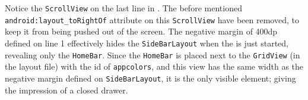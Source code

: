 Notice the \lstinline|ScrollView| on the last line in .
The before mentioned \lstinline{android:layout_toRightOf} attribute on this \lstinline|ScrollView| have been removed, to keep it from being pushed out of the screen.
The negative margin of 400dp defined on line 1 effectively hides the \lstinline|SideBarLayout| when the \homeactivity is just started, revealing only the \lstinline|HomeBar|.
Since the \lstinline|HomeBar| is placed next to the \lstinline|GridView| (in the layout file) with the id of \lstinline!appcolors!, and this view has the same width as the negative margin defined on \lstinline|SideBarLayout|, it is the only visible element; giving the impression of a closed drawer.



  
  



